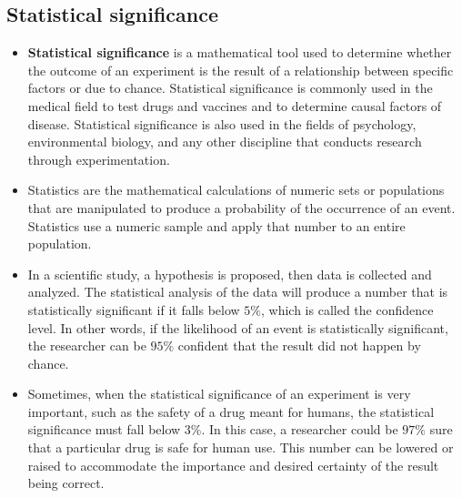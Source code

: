 \documentclass[12pt, a4paper]{article}
\begin{document}
\subsection{Statistical significance}

\begin{itemize}
\item \textbf{Statistical significance} is a mathematical tool used to determine whether the outcome of an experiment is the result of a relationship between specific factors or due to chance. Statistical significance is commonly used in the medical field to test drugs and vaccines and to determine causal factors of disease. Statistical significance is also used in the fields of psychology, environmental biology, and any other discipline that conducts research through experimentation.



\item Statistics are the mathematical calculations of numeric sets or populations that are manipulated to produce a probability of the occurrence of an event. Statistics use a numeric sample and apply that number to an entire population. 




\item In a scientific study, a hypothesis is proposed, then data is collected and analyzed. The statistical analysis of the data will produce a number that is statistically significant if it falls below $5\%$, which is called the confidence level. In other words, if the likelihood of an event is statistically significant, the researcher can be $95\%$ confident that the result did not happen by chance.



\item Sometimes, when the statistical significance of an experiment is very important, such as the safety of a drug meant for humans, the statistical significance must fall below $3\%$. In this case, a researcher could be $97\%$ sure that a particular drug is safe for human use. This number can be lowered or raised to accommodate the importance and desired certainty of the result being correct.




\end{itemize}
\end{document}
